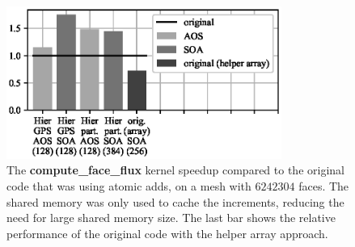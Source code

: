 
\begin{figure}[Htbp]
  \centering
  \includegraphics[width=9cm]{fig/mini_aero_speedup_nocache.eps}
  \caption{The \textbf{compute\_face\_flux} kernel speedup compared to the
  original code that was using atomic adds, on a mesh with
  $6242304$ faces. The shared memory was only used to cache the increments,
  reducing the need for large shared memory size. The last bar shows the
  relative performance of the original code with the helper array approach.}
  \label{fig:mini_aero_speedup_small-cache}
\end{figure}

